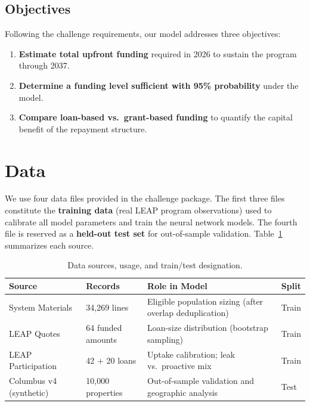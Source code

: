 \documentclass[11pt, letterpaper]{article}
\begin{document}
\subsection{Objectives}

Following the challenge requirements, our model addresses three objectives:

\begin{enumerate}[nosep]
  \item \textbf{Estimate total upfront funding} required in 2026 to sustain the program through 2037.
  \item \textbf{Determine a funding level sufficient with 95\% probability} under the model.
  \item \textbf{Compare loan-based vs.\ grant-based funding} to quantify the capital benefit of the repayment structure.
\end{enumerate}

\section{Data}
\label{sec:data}

We use four data files provided in the challenge package. The first three files constitute the \textbf{training data} (real LEAP program observations) used to calibrate all model parameters and train the neural network models. The fourth file is reserved as a \textbf{held-out test set} for out-of-sample validation. Table~\ref{tab:data_sources} summarizes each source.

\begin{table}[H]
  \centering
  \caption{Data sources, usage, and train/test designation.}
  \label{tab:data_sources}
  \begin{tabular}{@{}llp{4.5cm}l@{}}
    \toprule
    \textbf{Source} & \textbf{Records} & \textbf{Role in Model} & \textbf{Split} \\
    \midrule
    System Materials & 34{,}269 lines & Eligible population sizing (after overlap deduplication) & Train \\
    LEAP Quotes & 64 funded amounts & Loan-size distribution (bootstrap sampling) & Train \\
    LEAP Participation & 42 + 20 loans & Uptake calibration; leak vs.\ proactive mix & Train \\
    Columbus v4 (synthetic) & 10{,}000 properties & Out-of-sample validation and geographic analysis & Test \\
    \bottomrule
  \end{tabular}
\end{table}
\end{document}
